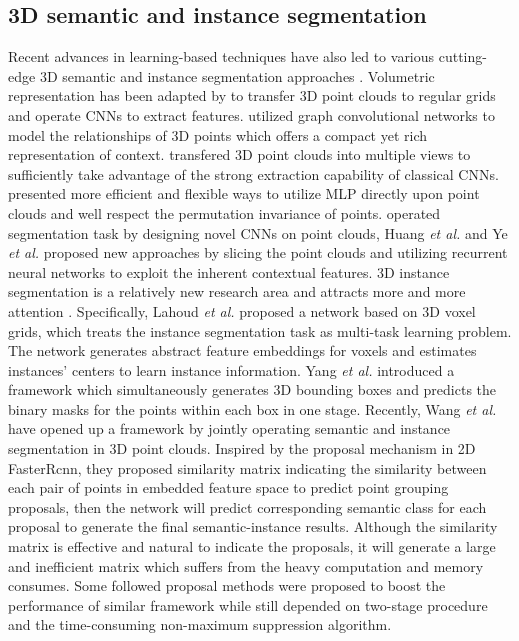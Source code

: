 \documentclass{cta-author}
\begin{document}
\subsection{3D semantic and instance segmentation}
Recent advances in learning-based techniques have also led to various cutting-edge 3D semantic and instance segmentation approaches \cite{Landrieu2018Large,te2018rgcnn,wang2019graph,wang2019voxsegnet,graham20183d,qi2016volumetric,dai20183dmv,qi2017pointnet,qi2017pointnet++,engelmann2017exploring,shen2018mining,li2018pointcnn,hua2018pointwise,huang2018recurrent,wu2019pointconv}. Volumetric representation has been adapted by \cite{wang2019voxsegnet,graham20183d} to transfer 3D point clouds to regular grids and operate CNNs to extract features.
\cite{Landrieu2018Large,te2018rgcnn,wang2019graph} utilized graph convolutional networks to model the relationships of 3D points which offers a compact yet rich representation of context. \cite{qi2016volumetric,dai20183dmv} transfered 3D point clouds into multiple views to sufficiently take advantage of the strong extraction capability of classical CNNs. \cite{qi2017pointnet,qi2017pointnet++,engelmann2017exploring,shen2018mining} presented more efficient and flexible ways to utilize MLP directly upon point clouds and well respect the permutation invariance of points. \cite{li2018pointcnn,hua2018pointwise,wu2019pointconv} operated segmentation task by designing novel CNNs on point clouds, Huang \emph{et al.} \cite{huang2018recurrent} and Ye \emph{et al.} \cite{Xiaoqing20183D} proposed new approaches by slicing the point clouds and utilizing recurrent neural networks to exploit the inherent contextual features.
3D instance segmentation is a relatively new research area and attracts more and more attention \cite{yang2019learning,lahoud20193d,liu2019masc}. Specifically, Lahoud \emph{et al.} \cite{lahoud20193d} proposed a network based on 3D voxel grids, which treats the instance segmentation task as multi-task learning problem. The network generates abstract feature embeddings for voxels and estimates instances' centers to learn instance information. Yang \emph{et al.} \cite{yang2019learning} introduced a framework which simultaneously generates 3D bounding boxes and predicts the binary masks for the points within each box in one stage.
Recently, Wang \emph{et al.} \cite{wang2018sgpn} have opened up a framework by jointly operating semantic and instance segmentation in 3D point clouds. Inspired by the proposal mechanism in 2D FasterRcnn\cite{ren2015faster}, they proposed similarity matrix indicating the similarity between each pair of points in embedded feature space to predict point grouping proposals, then the network will predict corresponding semantic class for each proposal to generate the final semantic-instance results. Although the similarity matrix is effective and natural to indicate the proposals, it will generate a large and inefficient matrix which suffers from the heavy computation and memory consumes. Some followed proposal methods \cite{yi2019gspn,hou20193d} were proposed to boost the performance of similar framework while still depended on two-stage procedure and the time-consuming non-maximum suppression algorithm. 
\end{document}
